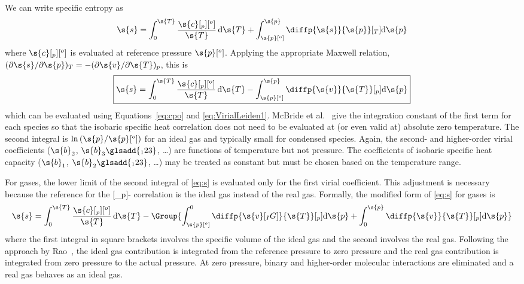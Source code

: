 We can write specific entropy as
\begin{equation}
  \s{s} = \int_0^{\s{T}}\frac{\s{c}[_p][^o]}{\s{T}}\,\mathrm{d}\s{T} + \int_{\s{p}[^o]}^{\s{p}}\diffp{\s{s}}{\s{p}}[_T]\mathrm{d}\s{p}%
\end{equation}
where $\s{c}[_p][^o]$ is evaluated at reference pressure $\s{p}[^o]$.  Applying the appropriate Maxwell relation, $(\partial\s{s}/\partial\s{p})_T = -(\partial\s{v}/\partial\s{T})_p$, this is
\begin{equation}
  \label{eq:s}
  \boxed{\s{s} = \int_0^{\s{T}}\frac{\s{c}[_p][^o]}{\s{T}}\,\mathrm{d}\s{T} - \int_{\s{p}[^o]}^{\s{p}}\diffp{\s{v}}{\s{T}}[_p]\mathrm{d}\s{p}}%
\end{equation}
which can be evaluated using Equations~\ref{eq:cpo} and \ref{eq:VirialLeiden1}.  McBride et al.~\cite{McBride2002} give the integration constant of the first term for each species so that the isobaric specific heat correlation does not need to be evaluated at (or even valid at) absolute zero temperature.  The second integral is $\ln{(\s{p}/\s{p}[^o])}$ for an ideal gas and typically small for condensed species.  Again, the second- and higher-order virial coefficients ($\s{b}_2$, $\s{b}_3\glsadd{_123}$, \dots) are functions of temperature but not pressure.  The coefficients of isobaric specific heat capacity ($\s{b}_1$, $\s{b}_2\glsadd{_123}$, \dots) may be treated as constant but must be chosen based on the temperature range.

For gases, the lower limit of the second integral of \autoref{eq:s} is evaluated only for the first virial coefficient.  This adjustment is necessary because the reference for the [_p]- correlation is the ideal gas instead of the real gas.  Formally, the modified form of \autoref{eq:s} for gases is
\begin{equation}
  \label{eq:sGas}
  \s{s} = \int_0^{\s{T}}\frac{\s{c}[_p][^o]}{\s{T}}\,\mathrm{d}\s{T} - \Group{\int_{\s{p}[^o]}^0\diffp{\s{v}[_IG]}{\s{T}}[_p]\mathrm{d}\s{p} + \int_0^{\s{p}}\diffp{\s{v}}{\s{T}}[_p]\mathrm{d}\s{p}}%
\end{equation}
where the first integral in square brackets involves the specific volume of the ideal gas and the second involves the real gas.  Following the approach by Rao~\cite{Rao1997}, %
the ideal gas contribution is integrated from the reference pressure to zero pressure and the real gas contribution is integrated from zero pressure to the actual pressure.  At zero pressure, binary and higher-order molecular interactions are eliminated and a real gas behaves as an ideal gas.

